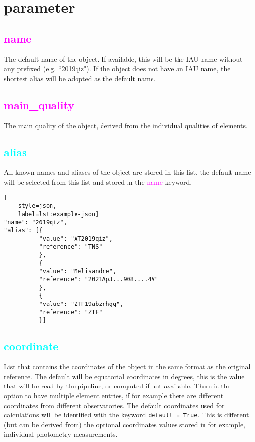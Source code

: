 \documentclass[tighten]{aastex631}
\newcommand{\property}[1]{\textcolor{cyan}{#1}}
\newcommand{\keyword}[1]{\textcolor{magenta}{#1}}
\begin{document}
\section{parameter} \label{sec:parameter}

\subsection{\keyword{name}} \label{sec:name}

The default name of the object. If available, this will be the IAU name without any prefixed (e.g. ``2019qiz"). If the object does not have an IAU name, the shortest alias will be adopted as the default name.

\subsection{\keyword{main\_quality}} \label{sec:main_quality}

The main quality of the object, derived from the individual qualities of elements.

\subsection{\property{alias}} \label{sec:alias}

All known names and aliases of the object are stored in this list, the default name will be selected from this list and stored in the \keyword{name} keyword.

\begin{lstlisting}[
    style=json,
    label=lst:example-json]
"name": "2019qiz",
"alias": [{
          "value": "AT2019qiz",
          "reference": "TNS"
          },
          {
          "value": "Melisandre",
          "reference": "2021ApJ...908....4V"
          },
          {
          "value": "ZTF19abzrhgq",
          "reference": "ZTF"
          }]
\end{lstlisting}


\subsection{\property{coordinate}} \label{sec:coordinate}

List that contains the coordinates of the object in the same format as the original reference. The default will be equatorial coordinates in degrees, this is the value that will be read by the pipeline, or computed if not available. There is the option to have multiple element entries, if for example there are different coordinates from different observatories. The default coordinates used for calculations will be identified with the keyword {\tt default = True}. This is different (but can be derived from) the optional coordinates values stored in for example, individual photometry measurements.
\end{document}
